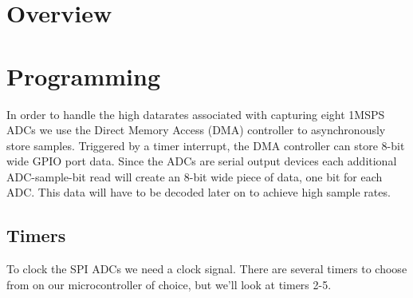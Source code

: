 \documentclass[11pt, a4paper]{article}
\begin{document}
\section{Overview}

\section{Programming}
In order to handle the high datarates associated with capturing eight 1MSPS ADCs we use the Direct Memory Access (DMA) controller to asynchronously store samples.
Triggered by a timer interrupt, the DMA controller can store 8-bit wide GPIO port data.
Since the ADCs are serial output devices each additional ADC-sample-bit read will create an 8-bit wide piece of data, one bit for each ADC.
This data will have to be decoded later on to achieve high sample rates.

\subsection{Timers}
To clock the SPI ADCs we need a clock signal.   
There are several timers to choose from on our microcontroller of choice, but we'll look at timers 2-5.

\begin{thebibliography}{1}
\end{thebibliography}
\end{document}
